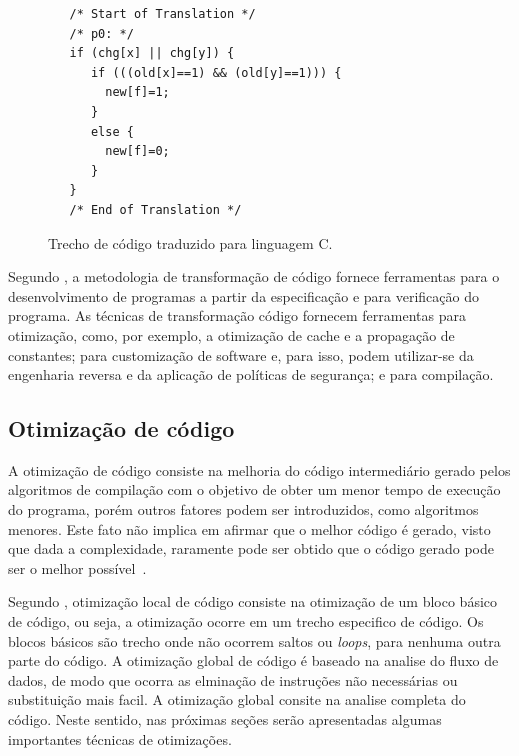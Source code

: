 \begin{figure}[thp]
\caption{\label{fig:cod_c} Trecho de código traduzido para linguagem C.}
	\begin{center}
    \begin{minipage}{0.9\textwidth}
    \begin{lstlisting}       
   /* Start of Translation */
   /* p0: */
   if (chg[x] || chg[y]) {
      if (((old[x]==1) && (old[y]==1))) {
      	new[f]=1;
      }
      else {
      	new[f]=0;
      }
   }
   /* End of Translation */

	\end{lstlisting}
    \end{minipage}
	\end{center}
\end{figure}

\par
Segundo , a metodologia de transformação de código fornece ferramentas para o desenvolvimento de programas a partir da especificação e para verificação do programa. As técnicas de transformação código fornecem ferramentas para otimização, como, por exemplo, a otimização de cache\cite{jin2001theoretical} e a propagação de constantes\cite{kildall1973unified}; para customização de software e, para isso, podem utilizar-se da engenharia reversa\cite{yang1997reverse} e da aplicação de políticas de segurança\cite{erlingsson2000sasi}; e para compilação.

\subsection{Otimização de código}
\par
A otimização de código consiste na melhoria do código intermediário gerado pelos algoritmos de compilação com o objetivo de obter um menor tempo de execução do programa, porém outros fatores podem ser introduzidos, como algoritmos menores. Este fato não implica em afirmar que o melhor código é gerado, visto que dada a complexidade, raramente pode ser obtido que o código gerado pode ser o melhor possível~\cite{aho2007compilers}.

\par
Segundo \citeauthor{aho2007compilers}, otimização local de código consiste na otimização de um bloco básico de código, ou seja, a otimização ocorre em um trecho especifico de código. Os blocos básicos são trecho onde não ocorrem saltos ou \textit{loops}, para nenhuma outra parte do código. A otimização global de código é baseado na analise do fluxo de dados, de modo que ocorra as elminação de instruções não necessárias ou substituição mais facil. A otimização global consite na analise completa do código. Neste sentido, nas próximas seções serão apresentadas algumas importantes técnicas de otimizações.

